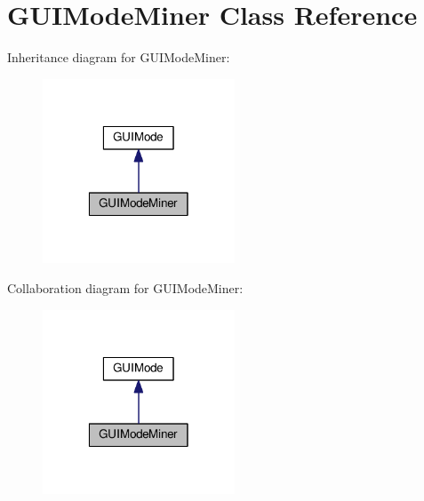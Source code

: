 \hypertarget{classGUIModeMiner}{\section{G\-U\-I\-Mode\-Miner Class Reference}
\label{classGUIModeMiner}
}


Inheritance diagram for G\-U\-I\-Mode\-Miner\-:
\nopagebreak
\begin{figure}[H]
\begin{center}
\leavevmode
\includegraphics[width=162pt]{classGUIModeMiner__inherit__graph}
\end{center}
\end{figure}


Collaboration diagram for G\-U\-I\-Mode\-Miner\-:
\nopagebreak
\begin{figure}[H]
\begin{center}
\leavevmode
\includegraphics[width=162pt]{classGUIModeMiner__coll__graph}
\end{center}
\end{figure}
